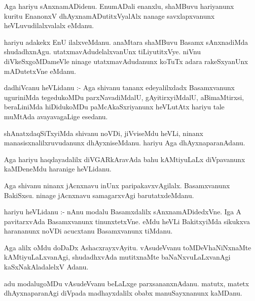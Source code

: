 \documentclass{article}
\begin{document}
\begin{mn}
Aga hariyu  sAnxnamADidenu.  EnumADali  enanxlu,  shaMBuvu  hariyanunx  kuritu  EnanonxV  dhAyxnamADutitxVyalAlx  
nanage  savxlapxvanunx  heVLuvudilalxvalalx  eMdanu.
\end{mn}

\begin{mn}
hariyu  adakekx  EnU  ilalxveMdanu.  anaMtara  shaMBuvu  Basamx sAnxnadiMda  shudadhxnAgu.  utatxmavAdudelalxvanUnx  
tiLiyutitxVye.  niVnu  diVkeSxgoMDameVle  ninage  utatxmavAdudanunx  koTuTx  adara  rakeSxyanUnx  mADutetxVne  eMdanu.
\end{mn}

\begin{mn}
dadhiVcanu  heVLidanu :- Aga  shivanu  tananx  edeyalilxdadx  Basamxvanunx  uguriniMda  tegedukoMDu  parxNavadiMdalU,  
gAyitirxyiMdalU,  aBimaMtirxsi,  beraLiniMda  hiDidukoMDu  paMcAkaSxriyanunx  heVLutAtx  hariyu  tale  muMtAda  
avayavagaLige  esedanu.  
\end{mn}

\begin{mn}
shAnatxdaqSiTxyiMda  shivanu  noVDi,  jiVviseMdu  heVLi,  ninanx  manasisxnalilxruvudanunx  dhAyxniseMdanu.  
hariyu  Aga  dhAyxnaparanAdanu.
\end{mn}

\begin{mn}
Aga  hariyu  haqdayadalilx  diVGARkAravAda  bahu  kAMtiyuLaLx  diVpavanunx  kaMDeneMdu  haranige  heVLidanu.
\end{mn}

\begin{mn}
Aga  shivanu  ninanx  jAcnxnavu  inUnx  paripakavxvAgilalx.  Basamxvanunx  BakiSxsu.  ninage  jAcnxnavu  
samagarxvAgi  barutatxdeMdanu.
\end{mn}

\begin{mn}
hariyu  heVLidanu :- nAnu  modalu  Basamxdalilx  sAnxnamADidedxVne.  Iga  A  pavitarxvAda  Basamxvanunx  
tinunxtetxVne.  eMdu  heVLi  BakitxyiMda  sikukxva  harananunx  noVDi  acucxtanu  Basamxvanunx  tiMdanu.
\end{mn}

\begin{mn}
Aga  alilx  oMdu  doDaDx  AshacxrayxvAyitu.  vAsudeVvanu  toMDeVhaNiNxnaMte  kAMtiyuLaLxvanAgi,  shudadhxvAda  
mutitxnaMte  baNaNxvuLaLxvanAgi  kaSxNakAladalelxV  Adanu.
\end{mn}

\begin{mn}
adu  modalugoMDu  vAsudeVvanu  beLaLxge  parxsananxnAdanu.  matutx,  matetx  dhAyxnaparanAgi  diVpada  
madhayxdalilx  obabx  manuSayxnanunx  kaMDanu.
\end{mn}
\end{document}
